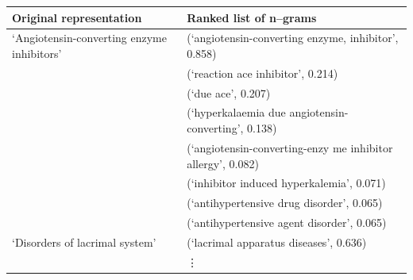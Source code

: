\documentclass{sig-alternate-05-2015}
\begin{document}
\begin{table}
\begin{center}
\begin{tabular}{l l}
\toprule
Original representation &  Ranked list of n--grams \\
\toprule
`Angiotensin-converting enzyme inhibitors' & (`angiotensin-converting enzyme, inhibitor', 0.858)\\
								 	& (`reaction ace inhibitor', 0.214)\\ 
									& (`due ace', 0.207)\\
									& (`hyperkalaemia due angiotensin-converting', 0.138)\\
									& (`angiotensin-converting-enzy me inhibitor allergy', 0.082)\\
									& (`inhibitor induced hyperkalemia', 0.071) \\
									& (`antihypertensive drug disorder', 0.065) \\
									& (`antihypertensive agent disorder', 0.065) \\
\hline
`Disorders of lacrimal system' & (`lacrimal apparatus diseases', 0.636)\\
& \vdots \\

\end{tabular}
\end{center}
\end{table}
\end{document}
